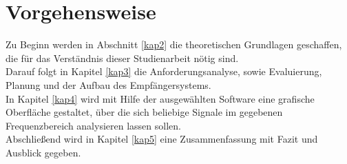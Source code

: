 \section{Vorgehensweise}
Zu Beginn werden in Abschnitt \ref{kap2} die theoretischen Grundlagen geschaffen, die für das Verständnis dieser Studienarbeit nötig sind. \\
Darauf folgt in Kapitel \ref{kap3} die Anforderungsanalyse, sowie Evaluierung, Planung und der Aufbau des Empfängersystems.\\
In Kapitel \ref{kap4} wird mit Hilfe der ausgewählten Software eine grafische Oberfläche gestaltet, über die sich beliebige Signale im gegebenen Frequenzbereich analysieren lassen sollen.\\
Abschließend wird in Kapitel \ref{kap5} eine Zusammenfassung mit Fazit und Ausblick gegeben.










